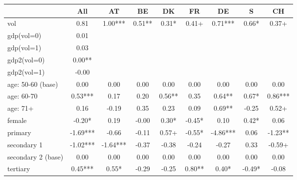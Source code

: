 {
\def\sym#1{\ifmmode^{#1}\else\(^{#1}\)\fi}
\begin{tabular}{l*{8}{c}}
\hline\hline
            &\multicolumn{1}{c}{All}&\multicolumn{1}{c}{AT}&\multicolumn{1}{c}{BE}&\multicolumn{1}{c}{DK}&\multicolumn{1}{c}{FR}&\multicolumn{1}{c}{DE}&\multicolumn{1}{c}{S}&\multicolumn{1}{c}{CH}\\
\hline
vol         &        0.81   &        1.00***&        0.51** &        0.31*  &        0.41+  &        0.71***&        0.66*  &        0.37+  \\
gdp(vol=0)  &        0.01   &               &               &               &               &               &               &               \\
gdp(vol=1)  &        0.03   &               &               &               &               &               &               &               \\
gdp2(vol=0) &        0.00** &               &               &               &               &               &               &               \\
gdp2(vol=1) &       -0.00   &               &               &               &               &               &               &               \\
age: 50-60 (base)&        0.00   &        0.00   &        0.00   &        0.00   &        0.00   &        0.00   &        0.00   &        0.00   \\
age: 60-70  &        0.53***&        0.17   &        0.20   &        0.56** &        0.35   &        0.64** &        0.67*  &        0.86***\\
age: 71+    &        0.16   &       -0.19   &        0.35   &        0.23   &        0.09   &        0.69** &       -0.25   &        0.52+  \\
female      &       -0.20*  &        0.19   &       -0.00   &        0.30*  &       -0.45*  &        0.10   &        0.42*  &        0.06   \\
primary     &       -1.69***&       -0.66   &       -0.11   &        0.57+  &       -0.55*  &       -4.86***&        0.06   &       -1.23** \\
secondary 1 &       -1.02***&       -1.64***&       -0.37   &       -0.38   &       -0.24   &       -0.27   &        0.33   &       -0.59+  \\
secondary 2 (base)&        0.00   &        0.00   &        0.00   &        0.00   &        0.00   &        0.00   &        0.00   &        0.00   \\
tertiary    &        0.45***&        0.55*  &       -0.29   &       -0.25   &        0.80** &        0.40*  &       -0.49*  &       -0.08   \\

\end{tabular}}
